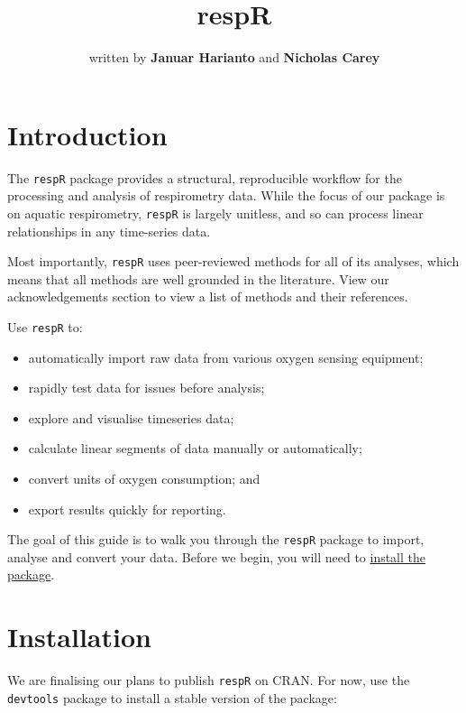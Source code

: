 \documentclass[]{book}
\title{respR}
\author{written by \textbf{Januar Harianto} and \textbf{Nicholas Carey}}
\date{}
\providecommand{\tightlist}{%
  \setlength{\itemsep}{0pt}\setlength{\parskip}{0pt}}
\begin{document}
\maketitle

{
\setcounter{tocdepth}{1}
\tableofcontents
}
\chapter{Introduction}\label{introduction}

The \texttt{respR} package provides a structural, reproducible workflow
for the processing and analysis of respirometry data. While the focus of
our package is on aquatic respirometry, \texttt{respR} is largely
unitless, and so can process linear relationships in any time-series
data.

Most importantly, \texttt{respR} uses peer-reviewed methods for all of
its analyses, which means that all methods are well grounded in the
literature. View our acknowledgements section to view a list of methods
and their references.

Use \texttt{respR} to:

\begin{itemize}
\tightlist
\item
  automatically import raw data from various oxygen sensing equipment;
\item
  rapidly test data for issues before analysis;
\item
  explore and visualise timeseries data;
\item
  calculate linear segments of data manually or automatically;
\item
  convert units of oxygen consumption; and
\item
  export results quickly for reporting.
\end{itemize}

The goal of this guide is to walk you through the \texttt{respR} package
to import, analyse and convert your data. Before we begin, you will need
to \protect\hyperlink{installation}{install the package}.

\hypertarget{installation}{\chapter{Installation}\label{installation}}

We are finalising our plans to publish \texttt{respR} on CRAN. For now,
use the \texttt{devtools} package to install a stable version of the
package:
\end{document}

